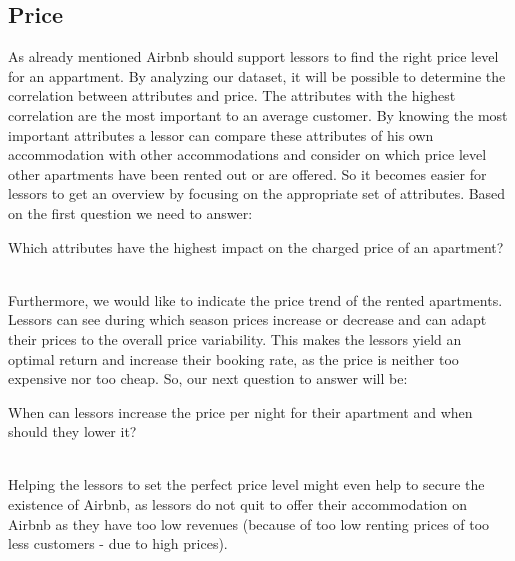 \documentclass[journal]{IEEEtran}
\begin{document}
\subsection{Price}
\noindent As already mentioned Airbnb should support lessors to find the right price level for an appartment. By analyzing our dataset, it will be possible to determine the correlation between attributes and price. The attributes with the highest correlation are the most important to an average customer. By knowing the most important attributes a lessor can compare these attributes of his own accommodation with other accommodations and consider on which price level other apartments have been rented out or are offered. So it becomes easier for lessors to get an overview by focusing on the appropriate set of attributes. Based on the first question we need to answer:
\begin{itshape}
Which attributes have the highest impact on the charged price of an apartment?
\end{itshape}\\
Furthermore, we would like to indicate the price trend of the rented apartments. Lessors can see during which season prices increase or decrease and can adapt their prices to the overall price variability. This makes the lessors yield an optimal return and increase their booking rate, as the price is neither too expensive nor too cheap. So, our next question to answer will be:
\begin{itshape}
When can lessors increase the price per night for their apartment and when should they lower it?
\end{itshape}\\
Helping the lessors to set the perfect price level might even help to secure the existence of Airbnb, as lessors do not quit to offer their accommodation on Airbnb as they have too low revenues (because of too low renting prices of too less customers - due to high prices).
\end{document}
